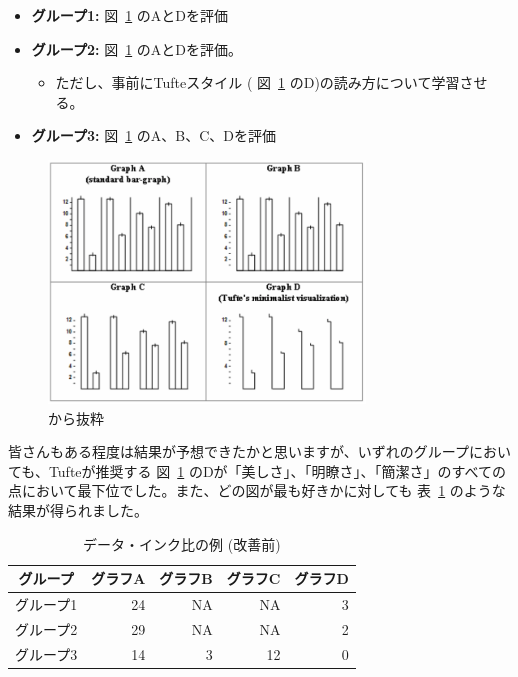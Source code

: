 \documentclass[
  a4paper,
  pandoc,
  ja=standard,
  jafont=haranoaji]{bxjsbook}
\providecommand{\tightlist}{%
  \setlength{\itemsep}{0pt}\setlength{\parskip}{0pt}}
\begin{document}
\begin{itemize}
\tightlist
\item
  \textbf{グループ1:} 図~\ref{fig-visual1_ratio4} のAとDを評価
\item
  \textbf{グループ2:} 図~\ref{fig-visual1_ratio4} のAとDを評価。

  \begin{itemize}
  \tightlist
  \item
    ただし、事前にTufteスタイル ( 図~\ref{fig-visual1_ratio4}
    のD)の読み方について学習させる。
  \end{itemize}
\item
  \textbf{グループ3:} 図~\ref{fig-visual1_ratio4} のA、B、C、Dを評価
\end{itemize}

\begin{figure}

{\centering \includegraphics[width=0.75\textwidth,height=\textheight]{./Figs/Visualization1/Dataink_ratio3.png}

}

\caption{\label{fig-visual1_ratio4}\citet{Inbar_et_al:2007} から抜粋}

\end{figure}

皆さんもある程度は結果が予想できたかと思いますが、いずれのグループにおいても、Tufteが推奨する
図~\ref{fig-visual1_ratio4}
のDが「美しさ」、「明瞭さ」、「簡潔さ」のすべての点において最下位でした。また、どの図が最も好きかに対しても
表~\ref{tbl-visual1_ratio5} のような結果が得られました。

\hypertarget{tbl-visual1_ratio5}{}
\begin{table}
\caption{\label{tbl-visual1_ratio5}データ・インク比の例 (改善前) }

\centering
\begin{tabular}{l|r|r|r|r}
\hline
\multicolumn{1}{c}{グループ} & \multicolumn{1}{c}{グラフA} & \multicolumn{1}{c}{グラフB} & \multicolumn{1}{c}{グラフC} & \multicolumn{1}{c}{グラフD}\\
\hline
グループ1 & 24 & NA & NA & 3\\
\hline
グループ2 & 29 & NA & NA & 2\\
\hline
グループ3 & 14 & 3 & 12 & 0\\
\hline
\end{tabular}
\end{table}
\end{document}
